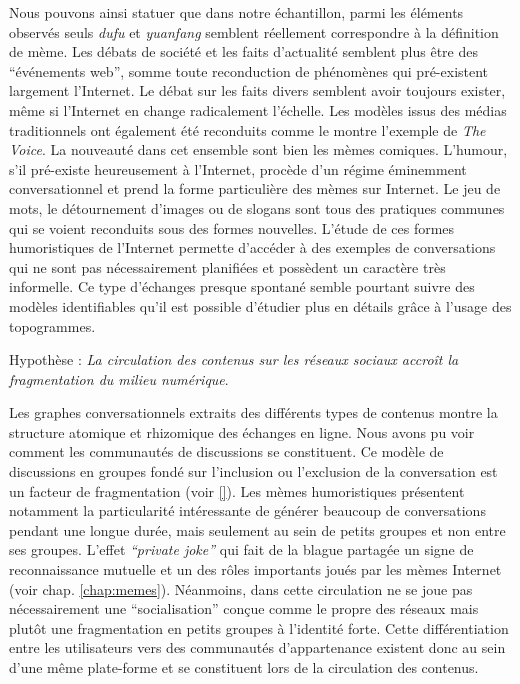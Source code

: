 Nous pouvons ainsi statuer que dans notre échantillon, parmi les éléments observés seuls \textit{dufu} et \textit{yuanfang} semblent réellement correspondre à la définition de mème. Les débats de société et les faits d'actualité semblent plus être des ``événements web'', somme toute reconduction de phénomènes qui pré-existent largement l'Internet. Le débat  sur les faits divers semblent avoir toujours exister, même si l'Internet en change radicalement l'échelle. Les modèles issus des médias traditionnels ont également été reconduits comme le montre l'exemple de \textit{The Voice}. La nouveauté dans cet ensemble sont bien les mèmes comiques. L'humour, s'il pré-existe heureusement à l'Internet, procède d'un régime éminemment conversationnel et prend la forme particulière des mèmes sur Internet. Le jeu de mots, le détournement d'images ou de slogans sont tous des pratiques communes qui se voient reconduits sous des formes nouvelles. L'étude de ces formes humoristiques de l'Internet permette d'accéder à des exemples de conversations qui ne sont pas nécessairement planifiées et possèdent un caractère très informelle. Ce type d'échanges presque spontané semble pourtant suivre des modèles identifiables qu'il est possible d'étudier plus en détails grâce à l'usage des topogrammes. 

Hypothèse : \textit{La circulation des contenus sur les réseaux sociaux accroît la fragmentation du milieu numérique}.

Les graphes conversationnels extraits des différents types de contenus montre la structure atomique et rhizomique des échanges en ligne. Nous avons pu voir comment les communautés de discussions se constituent. Ce modèle de discussions en groupes fondé sur l'inclusion ou l'exclusion de la conversation est un facteur de fragmentation (voir \ref{}). Les mèmes humoristiques présentent notamment la particularité intéressante de générer beaucoup de conversations pendant une longue durée, mais seulement au sein de petits groupes et non entre ses groupes. L'effet \textit{``private joke''} qui fait de la blague partagée un signe de reconnaissance mutuelle et un des rôles importants joués par les mèmes Internet (voir chap. \ref{chap:memes}). Néanmoins, dans cette circulation ne se joue pas nécessairement une ``socialisation'' conçue comme le propre des réseaux mais plutôt une fragmentation en petits groupes à l'identité forte. Cette différentiation entre les utilisateurs vers des communautés d'appartenance existent donc au sein d'une même plate-forme et se constituent lors de la circulation des contenus. 

